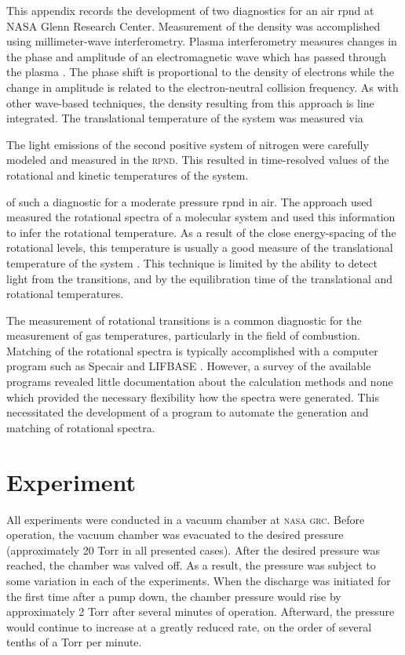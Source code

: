 This appendix records the development of two diagnostics for an air \acs{rpnd}
at NASA Glenn Research Center. Measurement of the density was accomplished using
millimeter-wave interferometry. Plasma interferometry measures changes in the
phase and amplitude of an electromagnetic wave which has passed through the
plasma \cite{Lieberman2005}. The phase shift is proportional to the density of
electrons while the change in amplitude is related to the electron-neutral
collision frequency. As with other wave-based techniques, the density resulting
from this approach is line integrated. The translational temperature of the
system was measured via 

The light emissions of the second positive system of nitrogen were carefully
modeled and measured in the \textsc{rpnd}. This resulted in time-resolved values
of the rotational and kinetic temperatures of the system.

 of such a diagnostic for a moderate
pressure \acs{rpnd} in air. The approach used measured the rotational spectra of
a molecular system and used this information to infer the rotational
temperature. As a result of the close energy-spacing of the rotational levels,
this temperature is usually a good measure of the translational temperature of
the system \cite{Laux1993}. This technique is limited by the ability to detect
light from the transitions, and by the equilibration time of the translational
and rotational temperatures.

The measurement of rotational transitions is a common diagnostic for the
measurement of gas temperatures, particularly in the field of combustion.
Matching of the rotational spectra is typically accomplished with a computer
program such as Specair \cite{Laux2002} and LIFBASE \cite{Luque1999}. However, a
survey of the available programs revealed little documentation about the
calculation methods and none which provided the necessary flexibility how the
spectra were generated. This necessitated the development of a program to
automate the generation and matching of rotational spectra.

\section{Experiment}

All experiments were conducted in a vacuum chamber at \textsc{nasa grc}. Before
operation, the vacuum chamber was evacuated to the desired pressure
(approximately 20 Torr in all presented cases). After the desired pressure was
reached, the chamber was valved off. As a result, the pressure was subject to
some variation in each of the experiments. When the discharge was initiated for
the first time after a pump down, the chamber pressure would rise by
approximately 2 Torr after several minutes of operation. Afterward, the pressure
would continue to increase at a greatly reduced rate, on the order of several
tenths of a Torr per minute.

